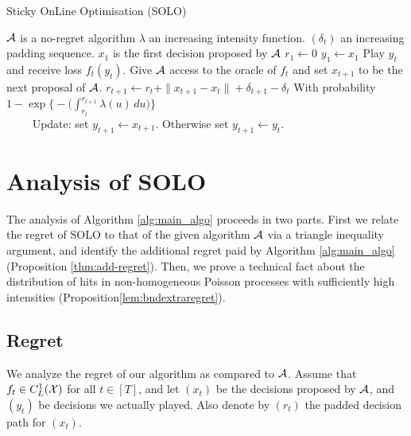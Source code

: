 \begin{algorithm}[h!] 
    \caption{Sticky OnLine Optimisation (SOLO)}
\label{alg:main_algo}
\begin{algorithmic}
  \STATE $\mathcal{A}$ is a no-regret algorithm
  \STATE $\lambda$ an increasing intensity function. 
  \STATE $(\delta_t)$ an increasing padding sequence. 
  \STATE $x_1$ is the first decision proposed by $\mathcal{A}$
  \STATE $r_1 \leftarrow 0$
  \STATE $y_1 \leftarrow x_1$ 
  \STATE Play $y_t$ and receive loss $f_t(y_t)$. 
  \STATE Give $\mathcal{A}$ access to the oracle of $f_t$ and set $x_{t+1}$ to be the next proposal of $\mathcal{A}$. 
  \STATE $r_{t+1} \leftarrow r_t + \|x_{t+1} - x_t\| + \delta_{t+1} - \delta_t$
  \STATE With probability $1 - \exp\big\{-\big(\int_{r_t}^{r_{t+1}} \lambda(u)\, du\big)\big\}$ \\
  \STATE $\qquad$ Update: set $y_{t+1} \leftarrow x_{t+1}$. 
  \STATE Otherwise set $y_{t+1} \leftarrow y_t$. 
  \ENDFOR
  
\end{algorithmic}
\end{algorithm}

\section{Analysis of SOLO}
\label{sec:analysis}
The analysis of Algorithm \ref{alg:main_algo} proceeds in two parts. First we relate the regret of SOLO to that of the given algorithm $\mathcal{A}$ via a triangle inequality argument, and identify the additional regret paid by Algorithm \ref{alg:main_algo} (Proposition \ref{thm:add-regret}). Then, we prove a technical fact about the distribution of hits in non-homogeneous Poisson processes with sufficiently high intensities (Proposition\ref{lem:bndextraregret}). 

\subsection{Regret}
We analyze the regret of our algorithm as compared to $\mathcal{A}$.  Assume that $f_t \in C^1_L(\mathcal{X})$ for all $t \in [T]$, and let $(x_t)$  be the decisions proposed by $\mathcal{A}$, and $(y_t)$ be decisions we actually played. Also denote by $(r_t)$ the padded decision path for $(x_t)$. 


